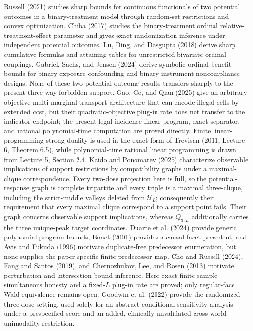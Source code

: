 \documentclass{article}
\begin{document}
Russell (2021) studies sharp bounds for continuous functionals of two potential outcomes in a binary-treatment model through random-set restrictions and convex optimization.  Chiba (2017) studies the binary-treatment ordinal relative-treatment-effect parameter and gives exact randomization inference under independent potential outcomes.  Lu, Ding, and Dasgupta (2018) derive sharp cumulative formulas and attaining tables for unrestricted bivariate ordinal couplings.  Gabriel, Sachs, and Jensen (2024) derive symbolic ordinal-benefit bounds for binary-exposure confounding and binary-instrument noncompliance designs.  None of these two-potential-outcome results transfers sharply to the present three-way forbidden support.  Gao, Ge, and Qian (2025) give an arbitrary-objective multi-marginal transport architecture that can encode illegal cells by extended cost, but their quadratic-objective plug-in rate does not transfer to the indicator endpoint; the present legal-incidence linear program, exact separator, and rational polynomial-time computation are proved directly.  Finite linear-programming strong duality is used in the exact form of Trevisan (2011, Lecture 6, Theorem 6.5), while polynomial-time rational linear programming is drawn from Lecture 5, Section 2.4.  Kaido and Ponomarev (2025) characterize observable implications of support restrictions by compatibility graphs under a maximal-clique correspondence.  Every two-dose projection here is full, so the potential-response graph is complete tripartite and every triple is a maximal three-clique, including the strict-middle valleys deleted from \(\mathcal U_L\); consequently their requirement that every maximal clique correspond to a support point fails.  Their graph concerns observable support implications, whereas \(Q_{3,L}\) additionally carries the three unique-peak target coordinates.  Duarte et al. (2024) provide generic polynomial-program bounds, Bonet (2001) provides a causal-facet precedent, and Avis and Fukuda (1996) motivate duplicate-free predecessor enumeration, but none supplies the paper-specific finite predecessor map.  Cho and Russell (2024), Fang and Santos (2019), and Chernozhukov, Lee, and Rosen (2013) motivate perturbation and intersection-bound inference.  Here exact finite-sample simultaneous honesty and a fixed-\(L\) plug-in rate are proved; only regular-face Wald equivalence remains open.  Goodwin et al. (2022) provide the randomized three-dose setting, used solely for an abstract conditional sensitivity analysis under a prespecified score and an added, clinically unvalidated cross-world unimodality restriction.
\end{document}
